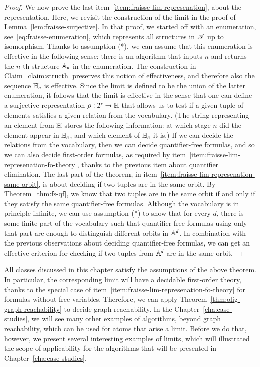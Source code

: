 \begin{proof}
We now prove the last item~\ref{item:fraisse-lim-represenation}, about the representation. Here, we revisit the construction of the \fraisse limit in the proof of Lemma~\ref{lem:fraisse-surjective}. In that proof, we started off with an enumeration, see~\eqref{eq:fraisse-enumeration}, which represents all structures in $\mathscr A$ up to isomorphism. Thanks to  assumption (*), we can assume that this enumeration  is effective in the following sense: there is an algorithm that inputs $n$ and returns the $n$-th structure $\mathbb A_n$ in the enumeration. The construction in Claim~\ref{claim:structh} preserves this notion of effectiveness, and therefore also the sequence $\mathbb H_n$ is effective. Since the \fraisse limit is defined to be the union of the latter enumeration, it follows that the \fraisse limit is effective in the sense that one can define a surjective representation  $\rho : 2^* \to \mathbb H$ that allows us to test if a given tuple of elements satisfies a given relation from the vocabulary. (The string representing an element from $\mathbb H$ stores the following information: at which stage $n$ did the element appear in $\mathbb H_n$, and which element of $\mathbb H_n$ it is.) If we can decide the relations from the vocabulary, then we can decide quantifier-free formulas, and so we can also decide first-order formulas, as required by item~\ref{item:fraisse-lim-represenation-fo-theory}, thanks to the previous item about quantifier elimination. The last part of the theorem, in item~\ref{item:fraisse-lim-represenation-same-orbit}, is about deciding if two tuples are in the same orbit. By Theorem~\ref{thm:fs-qf}, we know that two tuples are in the same orbit if and only if they satisfy the same quantifier-free formulas. Although the vocabulary is in principle infinite, we can use assumption (*) to show that for every $d$, there is some finite part of the vocabulary such that quantifier-free formulas using only that part are enough to distinguish different orbits in $\mathbb A^d$. In combination with the previous observations about deciding quantifier-free formulas, we can get an effective criterion for checking if two tuples from $\mathbb A^d$ are in the same orbit.
\end{proof}

All \fraisse classes discussed in this chapter satisfy the assumptions of the above theorem. In particular, the corresponding \fraisse limit will have a decidable first-order theory, thanks to the special case of item~\ref{item:fraisse-lim-represenation-fo-theory} for formulas without free variables. Therefore,  we can apply Theorem~\ref{thm:olig-graph-reachability} to decide graph reachability. In the Chapter~\ref{cha:case-studies}, we will see many other examples of algorithms, beyond graph reachability, which can be used for atoms that arise a \fraisse limit. Before we do that, however, we present several interesting examples of \fraisse limits, which will illustrated the scope of applicability for the algorithms that will be presented in Chapter~\ref{cha:case-studies}.
\exercisepart

